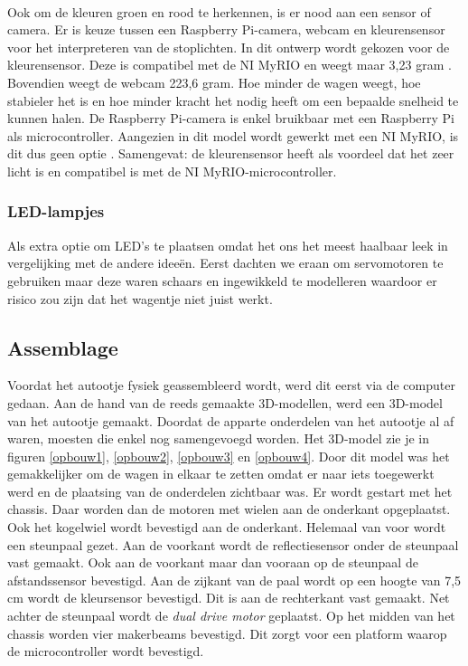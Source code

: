 \documentclass[a4paper,twoside,kulak]{kulakreport} %
\begin{document}
~

Ook om de kleuren groen en rood te herkennen, is er nood aan een sensor of camera. Er is keuze tussen een Raspberry Pi-camera, webcam en kleurensensor voor het interpreteren van de stoplichten. In dit ontwerp wordt gekozen voor de kleurensensor. Deze is compatibel met de NI MyRIO en weegt maar 3,23 gram \cite{Webcam,TCS34725KleurSensorBOB}. Bovendien weegt de webcam 223,6 gram. Hoe minder de wagen weegt, hoe stabieler het is en hoe minder kracht het nodig heeft om een bepaalde snelheid te kunnen halen. De Raspberry Pi-camera is enkel bruikbaar met een Raspberry Pi als microcontroller. Aangezien in dit model wordt gewerkt met een NI MyRIO, is dit dus geen optie \cite{RPi-camera}. Samengevat: de kleurensensor heeft als voordeel dat het zeer licht is en compatibel is met de NI MyRIO-microcontroller. %



\subsubsection{LED-lampjes}\label{LED-lampjes}
Als extra optie om LED's te plaatsen omdat het ons het meest haalbaar leek in vergelijking met de andere ideeën. Eerst dachten we eraan om servomotoren te gebruiken maar deze waren schaars en ingewikkeld te modelleren waardoor er risico zou zijn dat het wagentje niet juist werkt.


\subsection{Assemblage}\label{Assemblage}
Voordat het autootje fysiek geassembleerd wordt, werd dit eerst via de computer gedaan. Aan de hand van de reeds gemaakte 3D-modellen, werd een 3D-model van het autootje gemaakt. Doordat de apparte onderdelen van het autootje al af waren, moesten die enkel nog samengevoegd worden. Het 3D-model zie je in figuren \ref{opbouw1}, \ref{opbouw2}, \ref{opbouw3} en \ref{opbouw4}.
Door dit model was het gemakkelijker om de wagen in elkaar te zetten omdat er naar iets toegewerkt werd en de plaatsing van de onderdelen zichtbaar was. Er wordt gestart met het chassis. Daar worden dan de motoren met wielen aan de onderkant opgeplaatst. Ook het kogelwiel wordt bevestigd aan de onderkant. Helemaal van voor wordt een steunpaal gezet. Aan de voorkant wordt de reflectiesensor onder de steunpaal vast gemaakt. Ook aan de voorkant maar dan vooraan op de steunpaal de afstandssensor bevestigd. Aan de zijkant van de paal wordt op een hoogte van 7,5 cm wordt de kleursensor bevestigd. Dit is aan de rechterkant vast gemaakt. Net achter de steunpaal wordt de {\it dual drive motor} geplaatst. Op het midden van het chassis worden vier makerbeams bevestigd. 
Dit zorgt voor een platform waarop de microcontroller wordt bevestigd.
\end{document}
